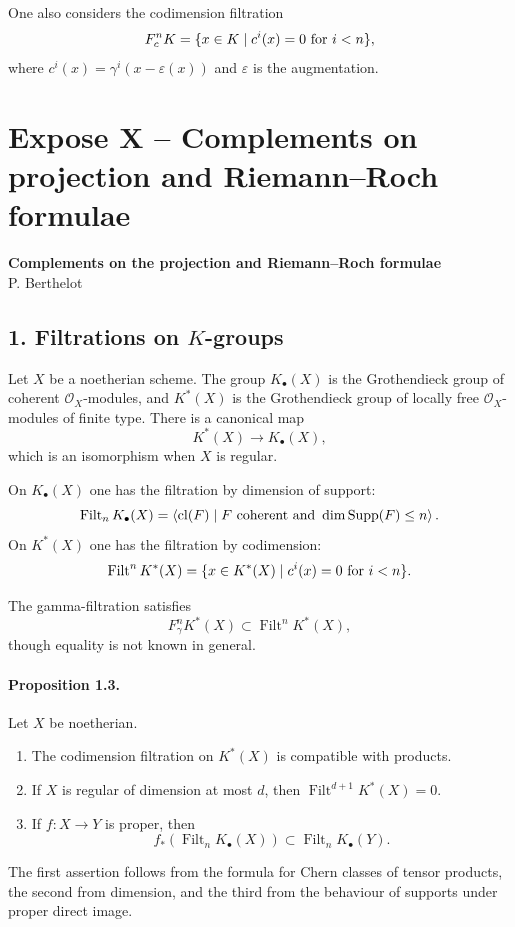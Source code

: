 \documentclass[12pt]{article}
\newcommand{\cO}{\mathcal O}
\newcommand{\Supp}{\operatorname{Supp}}
\newcommand{\Filt}{\operatorname{Filt}}
\newcommand{\cl}{\operatorname{cl}}
\newcommand{\longto}{\longrightarrow}
\newcommand{\eps}{\varepsilon}
\begin{document}
One also considers the codimension filtration
\[
F^n_cK=\{x\in K\mid c^i(x)=0\hbox{ for }i<n\},
\]
where $c^i(x)=\gamma^i(x-\eps(x))$ and $\eps$ is the augmentation.

\section*{Expose X -- Complements on projection and Riemann--Roch formulae}

\begin{center}
{\large\textbf{Complements on the projection and Riemann--Roch formulae}}\\[0.25em]
{\normalsize P. Berthelot}
\end{center}

\subsection*{1. Filtrations on $K$-groups}

Let $X$ be a noetherian scheme. The group $K_\bullet(X)$ is the Grothendieck group of coherent $\cO_X$-modules, and $K^*(X)$ is the Grothendieck group of locally free $\cO_X$-modules of finite type. There is a canonical map
\[
K^*(X)\longto K_\bullet(X),
\]
which is an isomorphism when $X$ is regular.

On $K_\bullet(X)$ one has the filtration by dimension of support:
\[
\Filt_nK_\bullet(X)=
\left\langle \cl(F)\mid F\hbox{ coherent and }\dim \Supp(F)\leq n\right\rangle.
\]
On $K^*(X)$ one has the filtration by codimension:
\[
\Filt^nK^*(X)=\{x\in K^*(X)\mid c^i(x)=0\hbox{ for }i<n\}.
\]

The gamma-filtration satisfies
\[
F^n_\gamma K^*(X)\subset \Filt^nK^*(X),
\]
though equality is not known in general.

\paragraph{Proposition 1.3.}
Let $X$ be noetherian.
\begin{enumerate}[label=\roman*)]
\item The codimension filtration on $K^*(X)$ is compatible with products.
\item If $X$ is regular of dimension at most $d$, then $\Filt^{d+1}K^*(X)=0$.
\item If $f:X\to Y$ is proper, then
\[
f_*(\Filt_nK_\bullet(X))\subset \Filt_nK_\bullet(Y).
\]
\end{enumerate}
The first assertion follows from the formula for Chern classes of tensor products, the second from dimension, and the third from the behaviour of supports under proper direct image.
\end{document}
